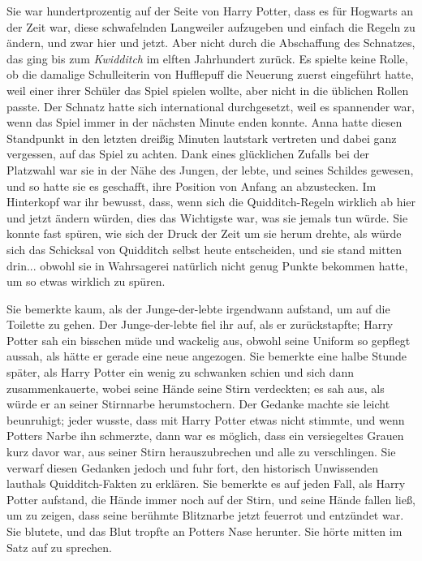 Sie war hundertprozentig auf der Seite von Harry Potter, dass es für Hogwarts an
der Zeit war, diese schwafelnden Langweiler aufzugeben und einfach die Regeln zu
ändern, und zwar hier und jetzt. Aber nicht durch die Abschaffung des Schnatzes,
das ging bis zum \emph{Kwidditch} im elften Jahrhundert zurück. Es spielte keine
Rolle, ob die damalige Schulleiterin von Hufflepuff die Neuerung zuerst
eingeführt hatte, weil einer ihrer Schüler das Spiel spielen wollte, aber nicht
in die üblichen Rollen passte. Der Schnatz hatte sich international
durchgesetzt, weil es spannender war, wenn das Spiel immer in der nächsten
Minute enden konnte. Anna hatte diesen Standpunkt in den letzten dreißig Minuten
lautstark vertreten und dabei ganz vergessen, auf das Spiel zu achten. Dank
eines glücklichen Zufalls bei der Platzwahl war sie in der Nähe des Jungen, der
lebte, und seines Schildes gewesen, und so hatte sie es geschafft, ihre Position
von Anfang an abzustecken. Im Hinterkopf war ihr bewusst, dass, wenn sich die
Quidditch-Regeln wirklich ab hier und jetzt ändern würden, dies das Wichtigste
war, was sie jemals tun würde. Sie konnte fast spüren, wie sich der Druck der
Zeit um sie herum drehte, als würde sich das Schicksal von Quidditch selbst
heute entscheiden, und sie stand mitten drin... obwohl sie in Wahrsagerei
natürlich nicht genug Punkte bekommen hatte, um so etwas wirklich zu spüren.

Sie bemerkte kaum, als der Junge-der-lebte irgendwann aufstand, um auf die
Toilette zu gehen. Der Junge-der-lebte fiel ihr auf, als er zurückstapfte; Harry
Potter sah ein bisschen müde und wackelig aus, obwohl seine Uniform so gepflegt
aussah, als hätte er gerade eine neue angezogen. Sie bemerkte eine halbe Stunde
später, als Harry Potter ein wenig zu schwanken schien und sich dann
zusammenkauerte, wobei seine Hände seine Stirn verdeckten; es sah aus, als würde
er an seiner Stirnnarbe herumstochern. Der Gedanke machte sie leicht beunruhigt;
jeder wusste, dass mit Harry Potter etwas nicht stimmte, und wenn Potters Narbe
ihn schmerzte, dann war es möglich, dass ein versiegeltes Grauen kurz davor war,
aus seiner Stirn herauszubrechen und alle zu verschlingen. Sie verwarf diesen
Gedanken jedoch und fuhr fort, den historisch Unwissenden lauthals
Quidditch-Fakten zu erklären. Sie bemerkte es auf jeden Fall, als Harry Potter
aufstand, die Hände immer noch auf der Stirn, und seine Hände fallen ließ, um zu
zeigen, dass seine berühmte Blitznarbe jetzt feuerrot und entzündet war. Sie
blutete, und das Blut tropfte an Potters Nase herunter. Sie hörte mitten im Satz
auf zu sprechen.

